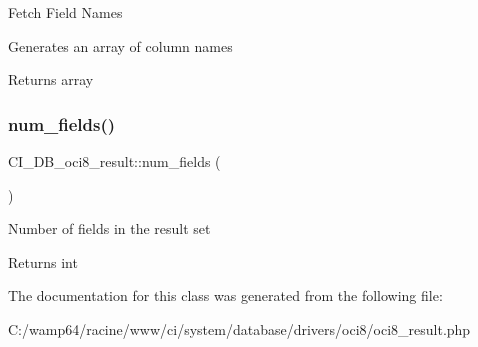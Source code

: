 Fetch Field Names

Generates an array of column names

\begin{DoxyReturn}{Returns}
array 
\end{DoxyReturn}
\mbox{\label{class_c_i___d_b__oci8__result_a526f909a930e9d74555b518d631ab4f5}} 
\subsubsection{\texorpdfstring{num\+\_\+fields()}{num\_fields()}}
{\footnotesize\ttfamily C\+I\+\_\+\+D\+B\+\_\+oci8\+\_\+result\+::num\+\_\+fields (\begin{DoxyParamCaption}{ }\end{DoxyParamCaption})}

Number of fields in the result set

\begin{DoxyReturn}{Returns}
int 
\end{DoxyReturn}


The documentation for this class was generated from the following file\+:\begin{DoxyCompactItemize}
\item 
C\+:/wamp64/racine/www/ci/system/database/drivers/oci8/oci8\+\_\+result.\+php\end{DoxyCompactItemize}
